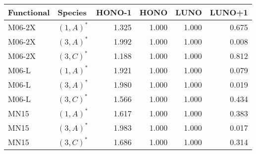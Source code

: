 \begin{tabular}{llrrrr}
\toprule
Functional &    Species &  HONO-1 &  HONO &  LUNO &  LUNO+1 \\
\midrule
    M06-2X &  $(1,A)^*$ &   1.325 & 1.000 & 1.000 &   0.675 \\
    M06-2X &  $(3,A)^*$ &   1.992 & 1.000 & 1.000 &   0.008 \\
    M06-2X &  $(3,C)^*$ &   1.188 & 1.000 & 1.000 &   0.812 \\
     M06-L &  $(1,A)^*$ &   1.921 & 1.000 & 1.000 &   0.079 \\
     M06-L &  $(3,A)^*$ &   1.980 & 1.000 & 1.000 &   0.019 \\
     M06-L &  $(3,C)^*$ &   1.566 & 1.000 & 1.000 &   0.434 \\
      MN15 &  $(1,A)^*$ &   1.617 & 1.000 & 1.000 &   0.383 \\
      MN15 &  $(3,A)^*$ &   1.983 & 1.000 & 1.000 &   0.017 \\
      MN15 &  $(3,C)^*$ &   1.686 & 1.000 & 1.000 &   0.314 \\
\bottomrule
\end{tabular}
